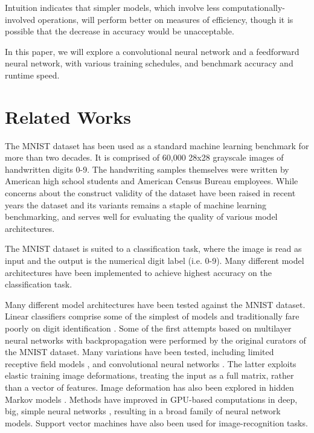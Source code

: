 \documentclass{article}
\begin{document}
Intuition indicates that simpler models,
which involve less computationally-involved operations,
will perform better on measures of efficiency,
though it is possible that the decrease in accuracy would be unacceptable.

In this paper, we will explore a convolutional neural network and a feedforward neural network,
with various training schedules, and benchmark accuracy and runtime speed.

\section{Related Works}

The MNIST dataset \citep{bottouComparisonClassifierMethods1994, krishnakantgujarHandwrittenDigitDatabase}
has been used as a standard machine learning benchmark
for more than two decades.
It is comprised of 60,000 28x28 grayscale images of handwritten digits 0-9.
The handwriting samples themselves were written by American high school students
and American Census Bureau employees.
While concerns about the construct validity of the dataset have been raised in recent years \citep{yadavColdCaseLost2019}
the dataset and its variants remains a staple of machine learning benchmarking,
and serves well for evaluating the quality of various model architectures.

The MNIST dataset is suited to a classification task,
where the image is read as input and the output is the numerical digit label (i.e. 0-9).
Many different model architectures have been implemented to achieve highest accuracy on the classification task.

Many different model architectures have been tested against the MNIST dataset.
Linear classifiers comprise some of the simplest of models and traditionally fare poorly on digit identification
\citep{bottouComparisonClassifierMethods1994}.
Some of the first attempts based on multilayer neural networks with backpropagation \citep{bottouComparisonClassifierMethods1994, lecunGradientbasedLearningApplied1998}
were performed by the original curators of the MNIST dataset.
Many variations have been tested, including limited receptive field models \citep{kussulImprovedMethodHandwritten2004},
and convolutional neural networks \citep{simardBestPracticesConvolutional2003}.
The latter exploits elastic training image deformations, treating the input as a full matrix,
rather than a vector of features.
Image deformation has also been explored in hidden Markov models \citep{keysersDeformationModelsImage2007}.
Methods have improved in GPU-based computations in deep, big, simple neural networks
\citep{ciresanDeepBigSimple2010, ciresanMulticolumnDeepNeural2012},
resulting in a broad family of neural network models.
Support vector machines \citep{decosteTrainingInvariantSupport2002} have also been used for image-recognition tasks.
\end{document}
